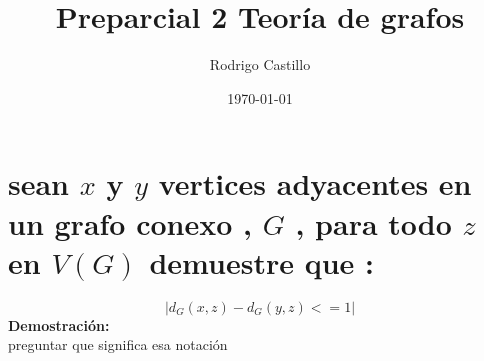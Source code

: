 \documentclass[10pt,a4paper]{article} %
\begin{document}
    \title{{  Preparcial 2 Teoría de grafos  }}
    \author{{Rodrigo Castillo}}
    \date{\today}

    \maketitle

    \section{sean $x$ y $y$ vertices adyacentes en un grafo conexo , $G$ , para
    todo $z$ en $V(G)$  demuestre que :}
    \begin{equation}
        |d_G (x,z) - d_G (y,z) <=1 |
    \end{equation}
    \textbf{Demostración:}
    \\
    \color{red} preguntar que significa esa notación \color{black}



\end{document}
